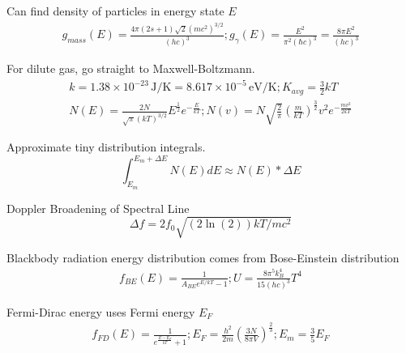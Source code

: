 \documentclass[8pt]{extarticle}
\newcommand{\e}[1]{e^{#1}}
\newcommand{\E}[1]{\times 10^{#1}}
\begin{document}
        Can find density of particles in energy state $E$
        \begin{gather*}
            g_{mass}(E) = \frac{4\pi(2s + 1)\sqrt{2}(mc^2)^{3/2}}{(hc)^3};
            g_{\gamma}(E) = \frac{E^2}{\pi^2(\hbar c)^3} = \frac{8\pi E^2}{(hc)^3}
        \end{gather*}

        For dilute gas, go straight to Maxwell-Boltzmann.
        \begin{gather*}
            k = 1.38\E{-23}\,\unit{\joule/\kelvin} = 8.617\E{-5}\,\unit{\eV/\kelvin};
            K_{avg} = \frac{3}{2}kT\\
            N(E) = \frac{2N}{\sqrt{\pi}(kT)^{3/2}}E^{\frac{1}{2}}\e{-\frac{E}{kT}};
            N(v) = N \sqrt{\frac{2}{\pi}}\left( \frac{m}{kT} \right)^\frac{3}{2} v^2 \e{-\frac{mv^2}{2kT}}
        \end{gather*}

        Approximate tiny distribution integrals.
        \begin{equation*}
            \int_{E_m}^{E_m + \Delta E} N(E) dE \approx N(E) * \Delta E
        \end{equation*}

        Doppler Broadening of Spectral Line
        \begin{equation*}
            \Delta f = 2f_0\sqrt{(2\ln(2))kT/mc^2}
        \end{equation*}

        Blackbody radiation energy distribution comes from Bose-Einstein distribution
        \begin{gather*}
            f_{BE}(E) = \frac{1}{A_{BE}\e{E/kT} - 1};
            U = \frac{8\pi^5 k_{B}^4}{15(hc)^3}T^4
        \end{gather*}

        Fermi-Dirac energy uses Fermi energy $E_F$
        \begin{gather*}
            f_{FD}(E) = \frac{1}{\e{\frac{E - E_F}{kT}} + 1};
            E_F = \frac{h^2}{2m}\left( \frac{3N}{8\pi V} \right)^\frac{2}{3}; 
            E_m = \frac{3}{5}E_F
        \end{gather*}
\end{document}
